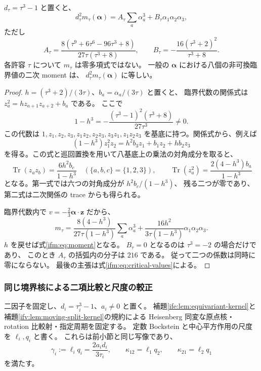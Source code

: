 \begin{lemma}
\label{ifm:lem:moment}
$d_\tau=\tau^3-1$ と置くと、
\begin{equation}\label{ifm:eq:moment}
 d_\tau^2m_\tau(\boldsymbol\alpha)
     =A_\tau\sum_a\alpha_a^3+B_\tau\alpha_1\alpha_2\alpha_3,
\end{equation}
ただし
\[
 A_\tau=\frac{8(\tau^9+6\tau^6-96\tau^3+8)}{27\tau(\tau^3+8)},
 \qquad
 B_\tau=-\frac{16(\tau^3+2)^2}{\tau^3+8}.
\]
各許容 $\tau$ について $m_\tau$ は零多項式ではない。
一般の $\boldsymbol\alpha$ における八個の非可換臨界値の二次 moment は、
$d_\tau^2m_\tau(\boldsymbol\alpha)$ に等しい。
\end{lemma}

\begin{proof}
$h=(\tau^3+2)/(3\tau)$、$b_a=\alpha_a/(3\tau)$ と置くと、
臨界代数の関係式は $z_a^2=h z_{a+1}z_{a+2}+b_a$ である。
ここで
\[
 1-h^3=-\frac{(\tau^3-1)^2(\tau^3+8)}{27\tau^3}\ne0.
\]
この代数は
$1,z_1,z_2,z_3,z_1z_2,z_2z_3,z_3z_1,z_1z_2z_3$
を基底に持つ。関係式から、例えば
\[
 (1-h^3)z_1^2z_2
       =h^2b_3z_1+b_1z_2+hb_2z_3
\]
を得る。この式と巡回置換を用いて八基底上の乗法の対角成分を取ると、
\[
 \operatorname{Tr}(z_az_b)
       =\frac{6h^2b_c}{1-h^3}\quad(\{a,b,c\}=\{1,2,3\}),
 \qquad
 \operatorname{Tr}(z_a^2)
       =\frac{2(4-h^3)b_a}{1-h^3}
\]
となる。第一式では六つの対角成分が $h^2b_c/(1-h^3)$、
残る二つが零であり、第二式は二次関係の trace からも得られる。

臨界代数内で $v=-\frac23\boldsymbol\alpha\cdot\mathbf z$ だから、
\[
 m_\tau
  =\frac{8(4-h^3)}{27\tau(1-h^3)}\sum_a\alpha_a^3
       +\frac{16h^2}{3\tau(1-h^3)}\alpha_1\alpha_2\alpha_3.
\]
$h$ を戻せば式\eqref{ifm:eq:moment}となる。
$B_\tau=0$ となるのは $\tau^3=-2$ の場合だけであり、
このとき $A_\tau$ の括弧内の分子は $216$ である。
従って二つの係数は同時に零にならない。
最後の主張は式\eqref{ifm:eq:critical-values}による。
\end{proof}

\subsubsection{同じ境界核による二項比較と尺度の較正}

二因子を固定し、$d_i=\tau_i^3-1$、$a_i\ne0$ と置く。
補題\ref{ife:lem:equivariant-kernel}と
補題\ref{ifv:lem:moving-split-kernel}の規約による
Heisenberg 同変な原点核・rotation 比較射・指定周期を固定する。
定数 Bockstein と中心平方作用の尺度を $\ell_i,q_i$ と書く。
これらは前小節と同じ写像であり、
\begin{equation}\label{ifm:eq:known-products}
 \gamma_i:=\ell_iq_i=\frac{2a_id_i}{3\tau_i},\qquad
 \kappa_{12}=\ell_1q_2,\qquad \kappa_{21}=\ell_2q_1
\end{equation}
を満たす。

